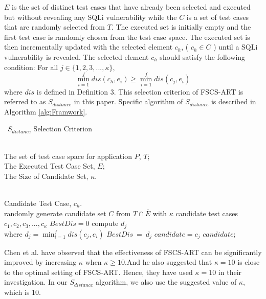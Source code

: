 \documentclass{sig-alternate}
\begin{document}
 $E$ is the set of distinct test cases that have already been selected and executed but without revealing any SQLi vulnerability while the $C$ is a set of test cases that are randomly selected from $T$. The executed set is initially empty and the first test case is randomly chosen from the test case space. The executed set is then incrementally updated with the selected element $c_{h}$, ( $c_{h} \in C$ ) until a SQLi vulnerability is revealed. The selected element $c_{h}$ should satisfy the following condition:
For all $ j \in \{1, 2, 3, ..., \kappa\} $, $$\min_{i=1}^{f} dis(c_{h}, e_{i}) \geq \min_{i=1}^{f} dis(c_{j}, e_{i}) $$
where $dis$ is defined in Definition 3. This selection criterion of FSCS-ART is referred to as $S_{distance}$ in this paper. Specific algorithm of $S_{distance}$ is described in Algorithm \ref{alg:Framwork}.

\renewcommand{\algorithmicrequire}{ \textbf{Input:}} %
\renewcommand{\algorithmicensure}{ \textbf{Output:}} %
\begin{algorithm}[htb] 
\caption{ ~$S_{distance}$ Selection Criterion  } 
\label{alg:Framwork} 
\begin{algorithmic}[1] %
\REQUIRE ~~\\ %
The set of test case space for application $P$, $T$;\\
The Executed Test Case Set, $E$;\\
The Size of Candidate Set, $\kappa$.

\ENSURE ~~\\ %
Candidate Test Case, $c_{h}$.\bigskip\\
\STATE randomly generate candidate set $C$ from $T\cap\bar{E}$
 with $\kappa$ candidate test cases $c_{1}, c_{2}, c_{3}, ..., c_{\kappa}$
\label{ code:fram:gen }
\STATE $BestDis = 0$
\STATE compute $d_{j}$\\where $ d_{j} = \min_{i=1}^{f} dis(c_{j}, e_{i})$
\STATE $BestDis~=~d_{j}$
\STATE $candidate = c_{j}$
\ENDIF
\ENDFOR
\RETURN $candidate$; %
\end{algorithmic}
\end{algorithm}

Chen et al.\cite{39239038} have observed that the effectiveness of FSCS-ART can be significantly improved by increasing $\kappa$ when $\kappa\geq10$.And he also suggested that $\kappa = 10$ is close to the optimal setting of
FSCS-ART. Hence, they have used $\kappa = 10$ in their investigation.\cite{chen2009adaptive} In our $S_{distance}$ algorithm, we also use the suggested value of $\kappa$, which is 10.
\end{document}
